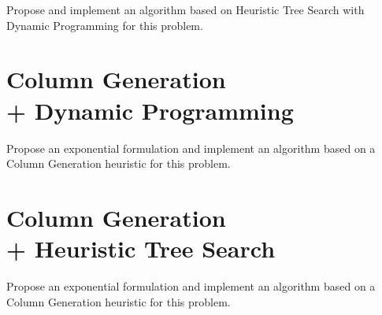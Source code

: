 \documentclass[a4paper,twocolumn]{article}
\begin{document}
Propose and implement an algorithm based on Heuristic Tree Search with Dynamic Programming for this problem.

\section{Column Generation \texorpdfstring{\\}{}  + Dynamic Programming}

Propose an exponential formulation and implement an algorithm based on a Column Generation heuristic for this problem.

\section{Column Generation \texorpdfstring{\\}{} + Heuristic Tree Search}

Propose an exponential formulation and implement an algorithm based on a Column Generation heuristic for this problem.

\printbibliography%
\end{document}
